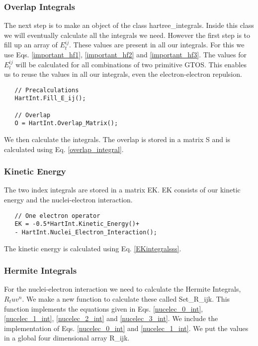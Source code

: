 \subsubsection{Overlap Integrals}
The next step is to make an object of the class hartree\_integrals. Inside this class we will eventually calculate all the integrals we need. However the first step is to fill up an array of $E_t^{ij}$. These values are present in all our integrals. For this we use Eqs. \eqref{important_hf1}, \eqref{important_hf2} and \eqref{important_hf3}. The values for $E_t^{ij}$ will be calculated for all combinations of two primitive GTOS. This enables us to reuse the values in all our integrals, even the electron-electron repulsion. \\

\begin{lstlisting}
   // Precalculations
   HartInt.Fill_E_ij();

   // Overlap
   O = HartInt.Overlap_Matrix();
\end{lstlisting}

We then calculate the integrals. The overlap is stored in a matrix S and is calculated using Eq. \eqref{overlap_integral}. \\

\subsubsection{Kinetic Energy}
The two index integrals are stored in a matrix EK. EK consists of our kinetic energy and the nuclei-electron interaction. \\ 

\begin{lstlisting}
   // One electron operator
   EK = -0.5*HartInt.Kinetic_Energy()+
   - HartInt.Nuclei_Electron_Interaction();
\end{lstlisting}

The kinetic energy is calculated using Eq. \eqref{EKintegralsss}. \\

\subsubsection{Hermite Integrals}
For the nuclei-electron interaction we need to calculate the Hermite Integrals, $R_tuv^n$. We make a new function to calculate these called Set\_R\_ijk. This function implements the equations given in Eqs. \eqref{nucelec_0_int}, \eqref{nucelec_1_int}, \eqref{nucelec_2_int} and \eqref{nucelec_3_int}. We include the implementation of Eqs. \eqref{nucelec_0_int} and  \eqref{nucelec_1_int}. We put the values in a global four dimensional array R\_ijk.

